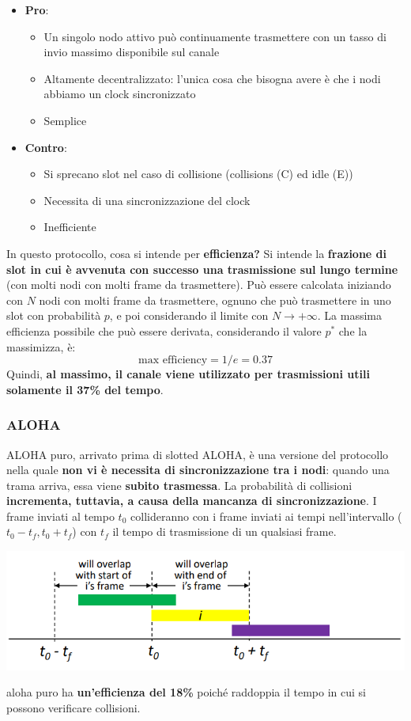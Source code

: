 \documentclass[12pt]{article}
\begin{document}
\begin{itemize}
    \item \textbf{Pro}:
    \begin{itemize}
        \item Un singolo nodo attivo può continuamente trasmettere con un tasso di invio massimo disponibile sul canale
        \item Altamente decentralizzato: l'unica cosa che bisogna avere è che i nodi abbiamo un clock sincronizzato 
        \item Semplice
    \end{itemize}
    \item \textbf{Contro}:
    \begin{itemize}
        \item Si sprecano slot nel caso di collisione (collisions (C) ed idle (E))
        \item Necessita di una sincronizzazione del clock
        \item Inefficiente
    \end{itemize}
\end{itemize}
In questo protocollo, cosa si intende per \textbf{efficienza?} Si intende la \textbf{frazione di slot in cui è avvenuta con successo una trasmissione sul lungo termine} (con molti nodi con molti frame da trasmettere).
Può essere calcolata iniziando con $N$ nodi con molti frame da trasmettere, ognuno che può trasmettere in uno slot con probabilità $p$, e poi considerando il limite con $N \rightarrow +\infty$.
La massima efficienza possibile che può essere derivata, considerando il valore $p^*$ che la massimizza, è:
$$\textrm{max efficiency} = 1/e = 0.37$$
Quindi, \textbf{al massimo, il canale viene utilizzato per trasmissioni utili solamente il 37\% del tempo}.
\subsubsection{ALOHA}
ALOHA puro, arrivato prima di slotted ALOHA, è una versione del protocollo nella quale \textbf{non vi è necessita di sincronizzazione tra i nodi}: quando una trama arriva, essa
viene \textbf{subito trasmessa}. La probabilità di collisioni \textbf{incrementa, tuttavia, a causa della mancanza di sincronizzazione}. I frame inviati al tempo $t_0$ collideranno con i frame inviati
ai tempi nell'intervallo ($t_0 - t_f, t_0 + t_f$) con $t_f$ il tempo di trasmissione di un qualsiasi frame.
\begin{center}
    \includegraphics[width =0.75\linewidth]{Images/121.png}
\end{center}
aloha puro ha \textbf{un'efficienza del 18\%} poiché raddoppia il tempo in cui si possono verificare collisioni.
\end{document}
